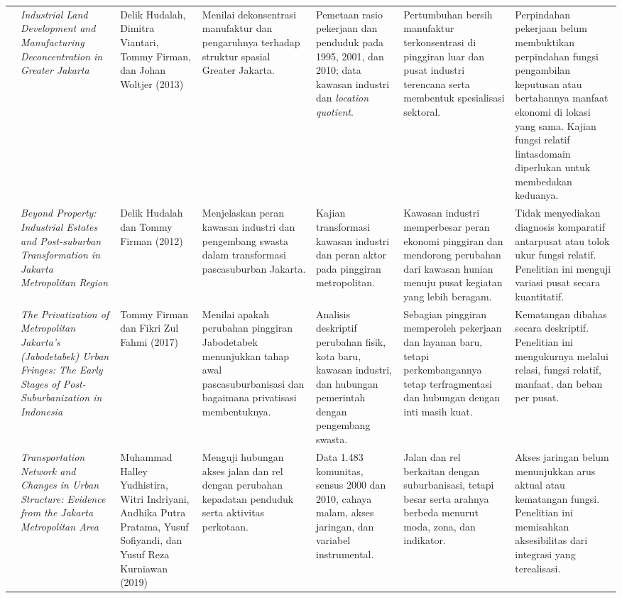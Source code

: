 \documentclass[12pt,a4paper,oneside,openany,indonesian]{report}
\begin{document}
\begin{landscape}
\begin{longtable}{>{\centering\arraybackslash}p{0.55cm}p{3.4cm}p{3.0cm}p{3.6cm}p{3.9cm}p{4.0cm}p{4.5cm}}
3 & \textit{Industrial Land Development and Manufacturing Deconcentration in Greater Jakarta} & Delik Hudalah, Dimitra Viantari, Tommy Firman, dan Johan Woltjer (2013) & Menilai dekonsentrasi manufaktur dan pengaruhnya terhadap struktur spasial Greater Jakarta. & Pemetaan rasio pekerjaan dan penduduk pada 1995, 2001, dan 2010; data kawasan industri dan \textit{location quotient}. & Pertumbuhan bersih manufaktur terkonsentrasi di pinggiran luar dan pusat industri terencana serta membentuk spesialisasi sektoral. & Perpindahan pekerjaan belum membuktikan perpindahan fungsi pengambilan keputusan atau bertahannya manfaat ekonomi di lokasi yang sama. Kajian fungsi relatif lintasdomain diperlukan untuk membedakan keduanya.\\
4 & \textit{Beyond Property: Industrial Estates and Post-suburban Transformation in Jakarta Metropolitan Region} & Delik Hudalah dan Tommy Firman (2012) & Menjelaskan peran kawasan industri dan pengembang swasta dalam transformasi pascasuburban Jakarta. & Kajian transformasi kawasan industri dan peran aktor pada pinggiran metropolitan. & Kawasan industri memperbesar peran ekonomi pinggiran dan mendorong perubahan dari kawasan hunian menuju pusat kegiatan yang lebih beragam. & Tidak menyediakan diagnosis komparatif antarpusat atau tolok ukur fungsi relatif. Penelitian ini menguji variasi pusat secara kuantitatif.\\
5 & \textit{The Privatization of Metropolitan Jakarta's (Jabodetabek) Urban Fringes: The Early Stages of Post-Suburbanization in Indonesia} & Tommy Firman dan Fikri Zul Fahmi (2017) & Menilai apakah perubahan pinggiran Jabodetabek menunjukkan tahap awal pascasuburbanisasi dan bagaimana privatisasi membentuknya. & Analisis deskriptif perubahan fisik, kota baru, kawasan industri, dan hubungan pemerintah dengan pengembang swasta. & Sebagian pinggiran memperoleh pekerjaan dan layanan baru, tetapi perkembangannya tetap terfragmentasi dan hubungan dengan inti masih kuat. & Kematangan dibahas secara deskriptif. Penelitian ini mengukurnya melalui relasi, fungsi relatif, manfaat, dan beban per pusat.\\
6 & \textit{Transportation Network and Changes in Urban Structure: Evidence from the Jakarta Metropolitan Area} & Muhammad Halley Yudhistira, Witri Indriyani, Andhika Putra Pratama, Yusuf Sofiyandi, dan Yusuf Reza Kurniawan (2019) & Menguji hubungan akses jalan dan rel dengan perubahan kepadatan penduduk serta aktivitas perkotaan. & Data 1.483 komunitas, sensus 2000 dan 2010, cahaya malam, akses jaringan, dan variabel instrumental. & Jalan dan rel berkaitan dengan suburbanisasi, tetapi besar serta arahnya berbeda menurut moda, zona, dan indikator. & Akses jaringan belum menunjukkan arus aktual atau kematangan fungsi. Penelitian ini memisahkan aksesibilitas dari integrasi yang terealisasi.\\

\end{longtable}
\end{landscape}
\end{document}
